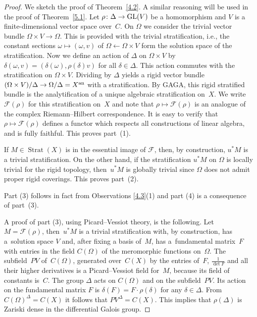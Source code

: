 \documentclass[pdftex]{sigma}
\numberwithin{equation}{section}
\begin{document}
\begin{proof}We sketch the proof of Theorem~\ref{4.2}. A similar reasoning will be used in the proof of Theorem~\ref{5.1}. Let $\rho\colon \Delta \rightarrow {\rm GL}(V)$ be a homomorphism and $V$ is a finite-dimensional vector space over~$C$. On $\Omega$ we consider the trivial vector bundle $\Omega \times V\rightarrow \Omega$. This is provided with the trivial stratification, i.e., the constant sections $\omega \mapsto (\omega ,v)$ of $\Omega \leftarrow \Omega \times V$ form the solution space of the stratification. Now we define an action of $\Delta$ on $\Omega \times V$ by $\delta (\omega, v)=(\delta (\omega), \rho(\delta )v)$ for all $\delta \in \Delta$. This action commutes with the stratification on $\Omega \times V$. Dividing by $\Delta$ yields a rigid vector bundle $(\Omega \times V)/\Delta \rightarrow \Omega /\Delta =X^{\rm an}$ with a stratification. By GAGA, this rigid stratified bundle is the analytification of a unique algebraic stratification on~$X$. We write $\mathcal{F}(\rho)$ for this stratification on~$X$ and note that $\rho \mapsto \mathcal{F}(\rho)$ is an analogue of the complex Riemann--Hilbert correspondence. It is easy to verify that $\rho \mapsto \mathcal{F}(\rho)$ defines a functor which respects all constructions of linear algebra, and is fully faithful. This proves part~(1).

If $M\in \operatorname{Strat}(X)$ is in the essential image of $\mathcal{F}$, then, by construction, $u^*M$ is a trivial stratification. On the other hand, if the stratification $u^*M$ on $\Omega$ is locally trivial for the rigid topology, then~$u^*M$ is globally trivial since $\Omega$ does not admit proper rigid coverings. This proves part~(2).

Part (3) follows in fact from Observations \ref{4.3}(1) and part (4) is a consequence of part~(3).

A proof of part (3), using Picard--Vessiot theory, is the following. Let $M=\mathcal{F}(\rho)$, then~$u^*M$ is a trivial stratification with, by construction, has a~solution space $V$ and, after fixing a basis of~$M$, has a~fundamental matrix~$F$ with entries in the field $C(\Omega)$ of the meromorphic functions on~$\Omega$. The subfield~$PV$ of~$C(\Omega)$, generated over~$C(X)$ by the entries of~$F$, $\frac{1}{\det F}$ and all their higher derivatives is a Picard--Vessiot field for~$M$, because its field of constants is~$C$. The group $\Delta$ acts on $C(\Omega)$ and on the subfield~$PV$. Its action on the fundamental matrix $F$ is $\delta (F)=F\cdot \rho(\delta)$ for any $\delta \in \Delta$. From $C(\Omega )^\Delta=C(X)$ it follows that $PV^\Delta =C(X)$. This implies that $\rho(\Delta)$ is Zariski dense in the differential Galois group.
\end{proof}
\end{document}
